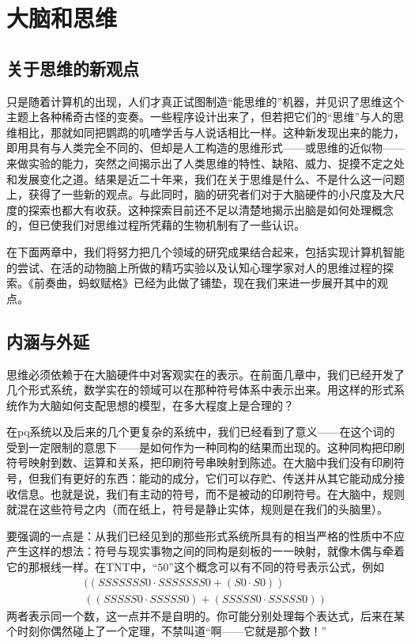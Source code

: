 
\chapter{大脑和思维}

\section{关于思维的新观点}

只是随着计算机的出现，人们才真正试图制造“能思维的”机器，并见识了思维这个主题上各种稀奇古怪的变奏。一些程序设计出来了，但若把它们的“思维”与人的思维相比，那就如同把鹦鹉的叽喳学舌与人说话相比一样。这种新发现出来的能力，即用具有与人类完全不同的、但却是人工构造的思维形式——或思维的近似物——来做实验的能力，突然之间揭示出了人类思维的特性、缺陷、威力、捉摸不定之处和发展变化之道。结果是近二十年来，我们在关于思维是什么、不是什么这一问题上，获得了一些新的观点。与此同时，脑的研究者们对于大脑硬件的小尺度及大尺度的探索也都大有收获。这种探索目前还不足以清楚地揭示出脑是如何处理概念的，但已使我们对思维过程所凭藉的生物机制有了一些认识。

在下面两章中，我们将努力把几个领域的研究成果结合起来，包括实现计算机智能的尝试、在活的动物脑上所做的精巧实验以及认知心理学家对人的思维过程的探索。《前奏曲，蚂蚁赋格》已经为此做了铺垫，现在我们来进一步展开其中的观点。

\section{内涵与外延}

思维必须依赖于在大脑硬件中对客观实在的表示。在前面几章中，我们已经开发了几个形式系统，数学实在的领域可以在那种符号体系中表示出来。用这样的形式系统作为大脑如何支配思想的模型，在多大程度上是合理的？

在pq系统以及后来的几个更复杂的系统中，我们已经看到了意义——在这个词的受到一定限制的意思下——是如何作为一种同构的结果而出现的。这种同构把印刷符号映射到数、运算和关系，把印刷符号串映射到陈述。在大脑中我们没有印刷符号，但我们有更好的东西：能动的成分，它们可以存贮、传送并从其它能动成分接收信息。也就是说，我们有主动的符号，而不是被动的印刷符号。在大脑中，规则就混在这些符号之内（而在纸上，符号是静止实体，规则是在我们的头脑里）。

要强调的一点是：从我们已经见到的那些形式系统所具有的相当严格的性质中不应产生这样的想法：符号与现实事物之间的同构是刻板的一一映射，就像木偶与牵着它的那根线一样。在TNT中，“$50$”这个概念可以有不同的符号表示公式，例如
\[
\begin{gathered}
((SSSSSSS0\cdot SSSSSSS0+(S0\cdot S0))\\
((SSSSS0\cdot SSSSS0)+(SSSSS0\cdot SSSSS0))
\end{gathered}
\]
两者表示同一个数，这一点并不是自明的。你可能分别处理每个表达式，后来在某个时刻你偶然碰上了一个定理，不禁叫道“啊——它就是那个数！”

